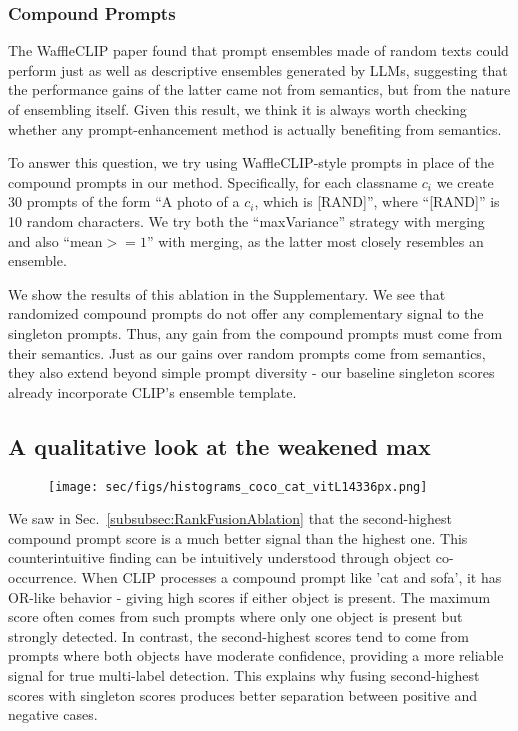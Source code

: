 \subsubsection{Compound Prompts}


The WaffleCLIP paper \cite{WaffleCLIP} found that prompt ensembles made of random texts could perform just as well as descriptive ensembles generated by LLMs, suggesting that the performance gains of the latter came not from semantics, but from the nature of ensembling itself. Given this result, we think it is always worth checking whether any prompt-enhancement method is actually benefiting from semantics.

To answer this question, we try using WaffleCLIP-style prompts in place of the compound prompts in our method. Specifically, for each classname $c_i$ we create 30 prompts of the form ``A photo of a $c_i$, which is [RAND]'', where ``[RAND]'' is 10 random characters. We try both the ``maxVariance'' strategy with merging and also ``mean$>=\!1$'' with merging, as the latter most closely resembles an ensemble.

We show the results of this ablation in the Supplementary. We see that randomized compound prompts do not offer any complementary signal to the singleton prompts. Thus, any gain from the compound prompts must come from their semantics. Just as our gains over random prompts come from semantics, they also extend beyond simple prompt diversity - our baseline singleton scores already incorporate CLIP's ensemble template.

\subsection{A qualitative look at the weakened max}
\label{subsec:qualitative}

\begin{figure}[t]
  \centering
   \texttt{[image: sec/figs/histograms\_coco\_cat\_vitL14336px.png]}
   \caption{\captionQualitativeHist}
   \label{fig:QualitativeHist}
\end{figure}

We saw in Sec.~\ref{subsubsec:RankFusionAblation} that the second-highest compound prompt score is a much better signal than the highest one. This counterintuitive finding can be intuitively understood through object co-occurrence. When CLIP processes a compound prompt like 'cat and sofa', it has OR-like behavior - giving high scores if either object is present. The maximum score often comes from such prompts where only one object is present but strongly detected. In contrast, the second-highest scores tend to come from prompts where both objects have moderate confidence, providing a more reliable signal for true multi-label detection. This explains why fusing second-highest scores with singleton scores produces better separation between positive and negative cases.


